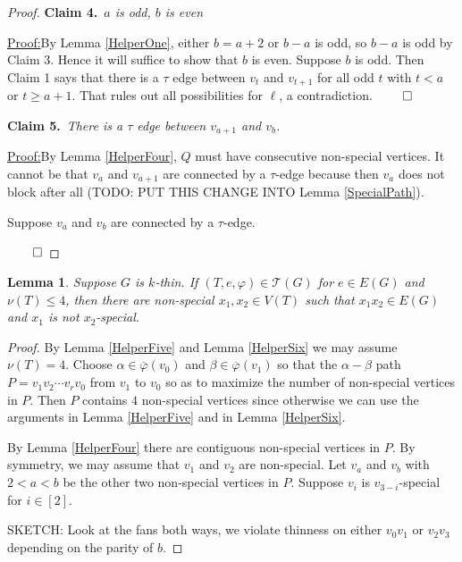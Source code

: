 \documentclass[12pt]{amsart}
\theoremstyle{plain}
\newtheorem{lem}[thm]{Lemma}
\theoremstyle{definition}
\theoremstyle{remark}
\newcommand{\fancy}[1]{\mathcal{#1}}
\newcommand{\T}{\fancy{T}}
\newcommand{\irange}[1]{\left[#1\right]}
\newcommand{\vph}{\varphi}
\newcommand{\vphn}{\overline{\varphi}}
\newcommand{\claim}[2]{{\noindent\bf Claim #1.}~{\it #2}~~}
\newenvironment{claimproof}[1]{\par\noindent\underline{Proof:}\space#1}{\leavevmode\unskip\penalty9999
\hbox{}\nobreak\hfill\quad\hbox{$\qed$}}
\begin{document}
\begin{proof}
\claim{4}{$a$ is odd, $b$ is even}

\begin{claimproof}
By Lemma \ref{HelperOne}, either $b = a+2$ or $b-a$ is odd, so $b-a$ is odd by Claim 3.  Hence it will suffice to show that $b$ is even.
Suppose $b$ is odd. Then Claim 1 says that there is a $\tau$ edge between $v_{t}$ and $v_{t+1}$ for all odd $t$ with $t < a$ or $t \ge a+1$.  That rules out all possibilities for $\ell$, a contradiction.
\end{claimproof}

\claim{5}{There is a $\tau$ edge between $v_{a+1}$ and $v_b$.}

\begin{claimproof}
By Lemma \ref{HelperFour}, $Q$ must have consecutive non-special vertices.  
It cannot be that $v_a$ and $v_{a+1}$ are connected by a $\tau$-edge because then $v_a$ does not block after all (TODO: PUT THIS CHANGE INTO Lemma \ref{SpecialPath}).

Suppose $v_a$ and $v_b$ are connected by a $\tau$-edge.

\end{claimproof}
\end{proof}

\begin{lem}\label{HelperSeven}
Suppose $G$ is $k$-thin. If $(T, e, \vph) \in \T(G)$ for $e \in E(G)$ and $\nu(T) \le 4$, then there are non-special $x_1,x_2 \in V(T)$ such that $x_1x_2 \in E(G)$ and $x_1$ is not $x_2$-special.
\end{lem}
\begin{proof}
By Lemma \ref{HelperFive} and Lemma \ref{HelperSix} we may assume $\nu(T) = 4$. 
Choose $\alpha \in \vphn(v_0)$ and $\beta \in \vphn(v_1)$ so that the $\alpha-\beta$ path $P = v_1v_2\cdots v_rv_0$ from $v_1$ to $v_0$ so as to maximize the number of non-special vertices in $P$.
Then $P$ contains $4$ non-special vertices since otherwise we can use the arguments in Lemma \ref{HelperFive} and in Lemma \ref{HelperSix}.

By Lemma \ref{HelperFour} there are contiguous non-special vertices in $P$.  By symmetry, we may assume that $v_1$ and $v_2$ are non-special.  Let $v_a$ and $v_b$ with $2 < a < b$ be the other two non-special vertices in $P$.
Suppose $v_i$ is $v_{3-i}$-special for $i \in \irange{2}$.  

SKETCH: Look at the fans both ways, we violate thinness on either $v_0v_1$ or $v_2v_3$ depending on the parity of $b$.
\end{proof}
\end{document}
